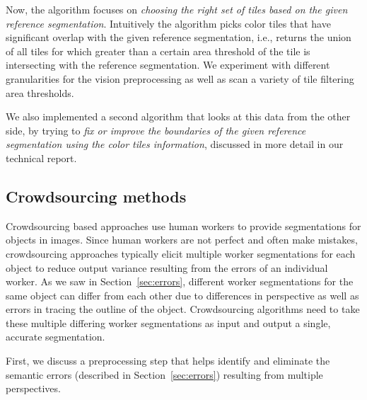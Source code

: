 Now, the algorithm focuses on {\em choosing the right set of tiles based on the given reference segmentation}. 
Intuitively the algorithm picks color tiles that have significant overlap with the given reference segmentation, i.e., returns the union of all tiles for which greater than a certain area threshold of the tile is intersecting with the reference segmentation. We experiment with different granularities for the vision preprocessing as well as scan a variety of tile filtering area thresholds. 

We also implemented a second algorithm that looks at this data from the other side, by trying to {\em fix or improve the boundaries of the given reference segmentation using the color tiles information}, discussed in more detail in our technical report.


\subsection{Crowdsourcing methods~\label{sec:crowd}}
Crowdsourcing based approaches use human workers to provide segmentations for objects in images. Since human workers are not perfect and often make mistakes, crowdsourcing approaches typically elicit multiple worker segmentations for each object to reduce output variance resulting from the errors of an individual worker. As we saw in Section~\ref{sec:errors}, different worker segmentations for the same object can differ from each other due to differences in perspective as well as errors in tracing the outline of the object. Crowdsourcing algorithms need to take these multiple differing worker segmentations as input and output a single, accurate segmentation. 

First, we discuss a preprocessing step that helps identify and eliminate the semantic errors (described in Section~\ref{sec:errors}) resulting from multiple perspectives.

